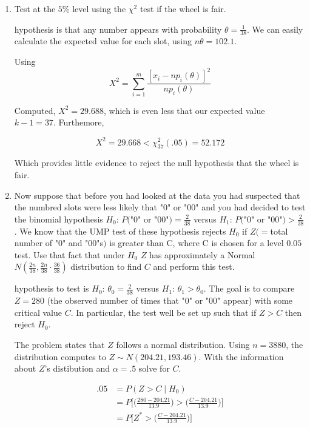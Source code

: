 \documentclass{tufte-book}
\theoremstyle{mytheoremstyle}
\theoremstyle{mylemstyle}
\theoremstyle{mydefstyle}
\begin{document}
\begin{enumerate}

\item Test at the $5\%$ level using the $\chi^2$ test if the wheel is fair.

 hypothesis is that any number appears with probability $\theta=\frac{1}{38}$.  We can easily calculate the expected value for each slot, using $n\theta=102.1$.

Using
\[ X^2 = \sum_{i=1}^m \frac{[x_i - np_i({\theta})]^2}{np_i({\theta})}\]

Computed, $X^2 = 29.688$, which is even less that our expected value $k-1=37$.  Furthemore,

\[X^2 = 29.668 < \chi^2_{37}(.05) = 52.172 \]

Which provides little evidence to reject the null hypothesis that the wheel is fair.

\item Now suppose that before you had looked at the data you had suspected that the numbred slots were less likely that "$0$" or "$00$" and you had decided to test the binomial hypothesis $H_0$: $P($"$0$" or "$00$"$)=\frac{2}{38}$ versus $H_1$: $P($"$0$" or "$00$"$) > \frac{2}{38}$.  We know that the UMP test of these hypothesis rejects $H_0$ if $Z(=$total number of "$0$" and "$00$"s$)$ is greater than C, where C is chosen for a level $0.05$ test.  Use that fact that under $H_0$ $Z$ has approximately a Normal $N(\frac{2n}{38},\frac{2n}{38}\cdot\frac{36}{38})$ distribution to find $C$ and perform this test.

 hypothesis to test is $H_0$: $\theta_0=\frac{2}{38}$ versus $H_1$: $\theta_1 > \theta_0$.  The goal is to compare $Z=280$ (the observed number of times that "0" or "00" appear) with some critical value $C$.  In particular, the test well be set up such that if $Z > C$ then reject $H_0$.

The problem states that $Z$ follows a normal distribution.  Using $n=3880$,  the distribution computes to $Z \sim N(204.21, 193.46)$.  With the information about $Z$'s distibution and $\alpha=.5$ solve for $C$.

\begin{align*}
.05 &= P(Z > C \mid H_0) \\
&= P\big[ \Big(\frac{280-204.21}{13.9}\Big) > \Big(\frac{C-204.21}{13.9}\Big)\Big]\\
&= P\big[ Z^* > \Big(\frac{C-204.21}{13.9}\Big)\Big]\\
\end{align*}


\end{enumerate}
\end{document}
